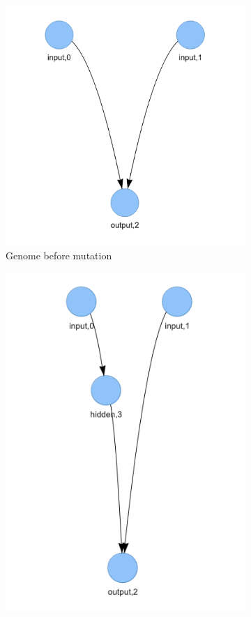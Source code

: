 \documentclass{article}
\begin{document}
\begin{figure}[h]
    \begin{subfigure}{.5\textwidth}
    \centering
      \includegraphics[width=1\linewidth]{first_genome.png}
      \caption{Genome before mutation}
    \end{subfigure}%
    \begin{subfigure}{.5\textwidth}
    \centering
      \includegraphics[width=1\linewidth]{second_genome.png}

\end{subfigure}
\end{figure}
\end{document}
